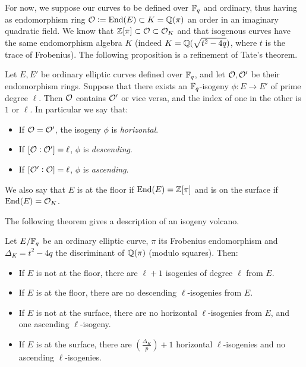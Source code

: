 For now, we suppose our curves to be defined over $\mathbb{F}_q$ and ordinary, thus having as endomorphism ring $\mathcal{O}:=\operatorname{End}(E)\subset K=\mathbb{Q}(\pi)$ an order in an imaginary quadratic field. We know that $\mathbb{Z}[\pi]\subset \mathcal{O}\subset\mathcal{O}_K$ and that isogenous curves have the same endomorphism algebra $K$ (indeed $K=\mathbb{Q}(\sqrt{t^2-4q})$, where $t$ is the trace of Frobenius). The following proposition is a refinement of Tate's theorem.
\begin{proposition}
    Let $E,E'$ be ordinary elliptic curves defined over $\mathbb{F}_q$, and let $\mathcal{O},\mathcal{O}'$ be their endomorphism rings. Suppose that there exists an $\mathbb{F}_q$-isogeny $\phi:E\to E'$ of prime degree $\ell$. Then $\mathcal{O}$ contains $\mathcal{O}'$ or vice versa, and the index of one in the other is $1$ or $\ell$. In particular we say that:
    \begin{itemize}
        \item If $\mathcal{O}=\mathcal{O}'$, the isogeny $\phi$ is \emph{horizontal}.
        \item If $[\mathcal{O}:\mathcal{O}']=\ell$, $\phi$ is \emph{descending}.
        \item If $[\mathcal{O}':\mathcal{O}]=\ell$, $\phi$ is \emph{ascending}.
    \end{itemize}
\end{proposition}
We also say that $E$ is at the floor if $\operatorname{End}(E)=\mathbb{Z}[\pi]$ and is on the surface if $\operatorname{End}(E)=\mathcal{O}_K$.

The following theorem gives a description of an isogeny volcano.
\begin{theorem}
    Let $E/\mathbb{F}_q$ be an ordinary elliptic curve, $\pi$ its Frobenius endomorphism and $\Delta_K=t^2-4q$ the discriminant of $\mathbb{Q}(\pi)$ (modulo squares). Then:
    \begin{itemize}
        \item If $E$ is not at the floor, there are $\ell+1$ isogenies of degree $\ell$ from $E$.
        \item If $E$ is at the floor, there are no descending $\ell$-isogenies from $E$.
        \item If $E$ is not at the surface, there are no horizontal $\ell$-isogenies from $E$, and one ascending $\ell$-isogeny.
        \item If $E$ is at the surface, there are $\left( \frac{\Delta_K}{p} \right)+1$ horizontal $\ell$-isogenies and no ascending $\ell$-isogenies.
    \end{itemize}
\end{theorem}

